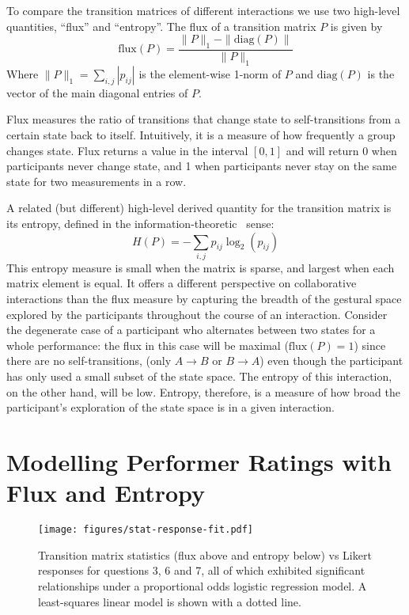 \documentclass{sigchi}
\begin{document}
To compare the transition matrices of different interactions we use
two high-level quantities, ``flux'' and ``entropy''. The flux of a
transition matrix $P$ is given by
\begin{equation}
  \mathrm{flux}(P) = \frac{\|P\|_1-\|\mathrm{diag}(P)\|}{\|P\|_1}
\end{equation}
Where $\|P\|_1 = \sum_{i,j}|p_{ij}|$ is the element-wise 1-norm of $P$
and $\mathrm{diag}(P)$ is the vector of the main diagonal entries of
$P$.

Flux measures the ratio of transitions that change
state to self-transitions from a certain state back to itself.
Intuitively, it is a measure of how frequently a group changes state. Flux
returns a value in the interval $[0,1]$ and will return 0 when
participants never change state, and 1 when participants never stay on
the same state for two measurements in a row.

A related (but different) high-level derived quantity for the
transition matrix is its entropy, defined in the
information-theoretic~\cite{Shannon:1948rt} sense:
\begin{equation}
  H(P) = -\sum_{i,j}p_{ij}\log_2(p_{ij})
\end{equation}
This entropy measure is small when the matrix is sparse, and largest
when each matrix element is equal. It offers a different perspective
on collaborative interactions than the flux measure by capturing the
breadth of the gestural space explored by the participants throughout
the course of an interaction. Consider the degenerate case of a
participant who alternates between two states for a whole performance:
the flux in this case will be maximal ($\mathrm{flux}(P) = 1$) since
there are no self-transitions, (only $A \rightarrow B$ or
$ B \rightarrow A$) even though the participant has only used a small
subset of the state space. The entropy of this interaction,
on the other hand, will be low. Entropy, therefore, is a measure of
how broad the participant's exploration of the state space is in a given
interaction.

\section{Modelling Performer Ratings with Flux and Entropy}

\begin{figure}
  \centering
  \texttt{[image: figures/stat-response-fit.pdf]}
  \caption{Transition matrix statistics (flux above and entropy below) vs Likert responses for
    questions 3, 6 and 7, all of which exhibited significant
    relationships under a proportional odds logistic regression model.
    A least-squares linear model is shown with a dotted line.
    \label{fig:stat-response-fit}}
\end{figure}
\end{document}
